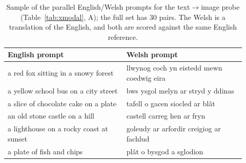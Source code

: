 \documentclass{article}
\begin{document}
\begin{table}[h]\centering\footnotesize
\setlength{\tabcolsep}{6pt}
\begin{tabular}{@{}p{0.46\linewidth}p{0.46\linewidth}@{}}
\toprule
\textbf{English prompt} & \textbf{Welsh prompt} \\
\midrule
a red fox sitting in a snowy forest & llwynog coch yn eistedd mewn coedwig eira \\
a yellow school bus on a city street & bws ysgol melyn ar stryd y ddinas \\
a slice of chocolate cake on a plate & tafell o gacen siocled ar bl\^at \\
an old stone castle on a hill & castell carreg hen ar fryn \\
a lighthouse on a rocky coast at sunset & goleudy ar arfordir creigiog ar fachlud \\
a plate of fish and chips & pl\^at o bysgod a sglodion \\
\bottomrule
\end{tabular}
\caption{Sample of the parallel English/Welsh prompts for the text$\to$image
probe (Table~\ref{tab:xmodal}, A); the full set has $30$ pairs. The Welsh is
a translation of the English, and both are scored against the same English
reference.}
\label{tab:xmodal-welsh-prompts}
\end{table}
\end{document}

